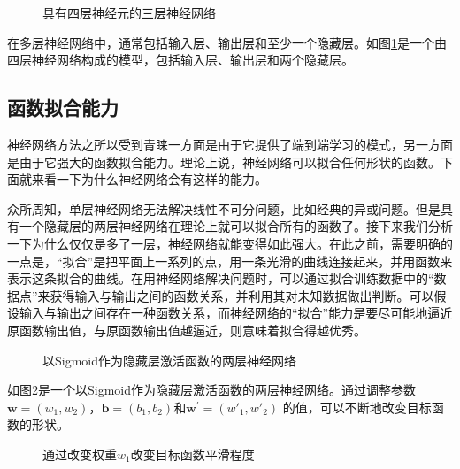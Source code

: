 \begin{figure}[htp]
\centering

\caption{具有四层神经元的三层神经网络}
\label{fig:5-17}
\end{figure}

\parinterval 在多层神经网络中，通常包括输入层、输出层和至少一个隐藏层。如图\ref{fig:5-17}是一个由四层神经网络构成的模型，包括输入层、输出层和两个隐藏层。\\


\subsection{函数拟合能力}

\parinterval 神经网络方法之所以受到青睐一方面是由于它提供了端到端学习的模式，另一方面是由于它强大的函数拟合能力。理论上说，神经网络可以拟合任何形状的函数。下面就来看一下为什么神经网络会有这样的能力。

\parinterval 众所周知，单层神经网络无法解决线性不可分问题，比如经典的异或问题。但是具有一个隐藏层的两层神经网络在理论上就可以拟合所有的函数了。接下来我们分析一下为什么仅仅是多了一层，神经网络就能变得如此强大。在此之前，需要明确的一点是，``拟合''是把平面上一系列的点，用一条光滑的曲线连接起来，并用函数来表示这条拟合的曲线。在用神经网络解决问题时，可以通过拟合训练数据中的``数据点''来获得输入与输出之间的函数关系，并利用其对未知数据做出判断。可以假设输入与输出之间存在一种函数关系，而神经网络的``拟合''能力是要尽可能地逼近原函数输出值，与原函数输出值越逼近，则意味着拟合得越优秀。

\begin{figure}[htp]
\centering

\caption{以Sigmoid作为隐藏层激活函数的两层神经网络}
\label{fig:5-18}
\end{figure}

\parinterval 如图\ref{fig:5-18}是一个以Sigmoid作为隐藏层激活函数的两层神经网络。通过调整参数$ \mathbf w=(w_1,w_2) $，$ \mathbf b=(b_1,b_2) $和$ \mathbf w^{'}=(w'_{1},w'_{2}) $ 的值，可以不断地改变目标函数的形状。

\begin{figure}[htp]
\centering

\caption{通过改变权重$ w_1 $改变目标函数平滑程度}
\label{fig:5-19}
\end {figure}

